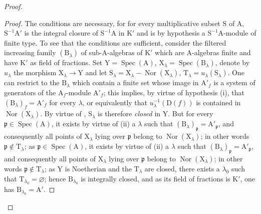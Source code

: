 \begin{proof}
\begin{proof}
The conditions are necessary, for for every multiplicative subset $\mathrm{S}$ of $\mathrm{A}$,
$\mathrm{S}^{-1}\mathrm{A}'$ is the integral closure of $\mathrm{S}^{-1}\mathrm{A}$ in $\mathrm{K}'$ and is by hypothesis a $\mathrm{S}^{-1}\mathrm{A}$-module
of finite type. To see that the conditions are sufficient, consider the filtered increasing
family $(\mathrm{B}_\lambda)$ of sub-$\mathrm{A}$-algebras of $\mathrm{K}'$ which are $\mathrm{A}$-algebras finite and have $\mathrm{K}'$ as
field of fractions. Set $\mathrm{Y}=\operatorname{Spec}(\mathrm{A})$, $\mathrm{X}_\lambda=\operatorname{Spec}(\mathrm{B}_\lambda)$, denote by $u_\lambda$ the
morphism $\mathrm{X}_\lambda\to\mathrm{Y}$ and let $\mathrm{S}_\lambda=\mathrm{X}_\lambda-\operatorname{Nor}(\mathrm{X}_\lambda)$, $\mathrm{T}_\lambda=u_\lambda(\mathrm{S}_\lambda)$. One can restrict to the $\mathrm{B}_\lambda$
which contain a finite set whose image in $\mathrm{A}'_f$ is a system of generators of the
$\mathrm{A}_f$-module $\mathrm{A}'_f$; this implies, by virtue of hypothesis (i), that $(\mathrm{B}_\lambda)_f=\mathrm{A}'_f$ for every $\lambda$,
or equivalently that $u_\lambda^{-1}(\mathrm{D}(f))$ is contained in $\operatorname{Nor}(\mathrm{X}_\lambda)$. By virtue of , $\mathrm{S}_\lambda$ is therefore
\emph{closed} in $\mathrm{Y}$. But for every
$\mathfrak{p}\in\operatorname{Spec}(\mathrm{A})$, it exists by virtue of (ii) a $\lambda$ such that $(\mathrm{B}_\lambda)_\mathfrak{p}=\mathrm{A}'_\mathfrak{p}$, and consequently all points
of $\mathrm{X}_\lambda$ lying over $\mathfrak{p}$ belong to $\operatorname{Nor}(\mathrm{X}_\lambda)$; in other words $\mathfrak{p}\notin\mathrm{T}_\lambda$; as
$\mathfrak{p}\in\operatorname{Spec}(\mathrm{A})$, it exists by virtue of (ii) a $\lambda$ such that $(\mathrm{B}_\lambda)_\mathfrak{p}=\mathrm{A}'_\mathfrak{p}$, and consequently all points
of $\mathrm{X}_\lambda$ lying over $\mathfrak{p}$ belong to $\operatorname{Nor}(\mathrm{X}_\lambda)$; in other words $\mathfrak{p}\notin\mathrm{T}_\lambda$; as
$\mathrm{Y}$ is Noetherian and the $\mathrm{T}_\lambda$ are closed, there exists a $\lambda_0$ such that $\mathrm{T}_{\lambda_0}=\varnothing$; hence $\mathrm{B}_{\lambda_0}$
is integrally closed, and as its field of fractions is $\mathrm{K}'$, one has $\mathrm{B}_{\lambda_0}=\mathrm{A}'$.
\end{proof}


\end{proof}
